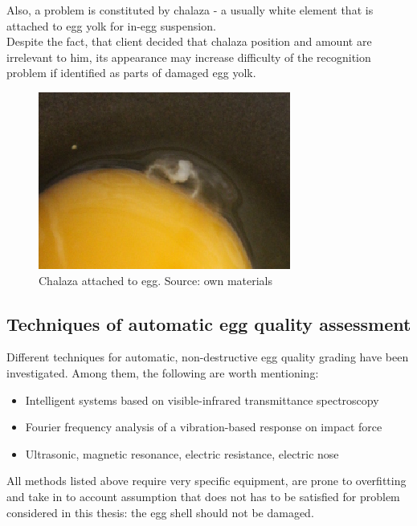 \documentclass[12pt,twoside,a4paper]{article}
\begin{document}
Also, a problem is constituted by chalaza - a usually white element that is attached to egg yolk for in-egg suspension.\\
Despite the fact, that client decided that chalaza position and amount are irrelevant to him, its appearance may increase difficulty of the recognition problem if identified as parts of damaged egg yolk.

 
\begin{figure}[H]
\centering
\includegraphics[width=0.4\paperwidth]{chalaza}
\caption{Chalaza attached to egg. Source: own materials}
\end{figure}


\subsection{Techniques of automatic egg quality assessment}

Different techniques for automatic, non-destructive egg quality grading have been investigated.
Among them, the following are worth mentioning:
\begin{itemize}
\item Intelligent systems based on visible-infrared transmittance spectroscopy\cite{agri}
\item Fourier frequency analysis of a vibration-based response on impact force\cite{svm} 
\item Ultrasonic, magnetic resonance, electric resistance, electric nose\cite{nondestr}  
\end{itemize}
All methods listed above require very specific equipment, are prone to overfitting and take in to account assumption that does not has to be satisfied for problem considered in this thesis: the egg shell should not be damaged.
\end{document}
